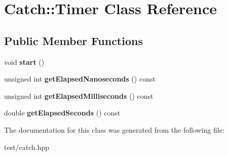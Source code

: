 \hypertarget{classCatch_1_1Timer}{}\section{Catch\+:\+:Timer Class Reference}
\label{classCatch_1_1Timer}
\subsection*{Public Member Functions}
\begin{DoxyCompactItemize}
\item 
void {\bfseries start} ()\hypertarget{classCatch_1_1Timer_a0a56e879e43f36c102bf9ea8b5fc8b72}{}\label{classCatch_1_1Timer_a0a56e879e43f36c102bf9ea8b5fc8b72}

\item 
unsigned int {\bfseries get\+Elapsed\+Nanoseconds} () const \hypertarget{classCatch_1_1Timer_ad88ea4dc75a07e5c6d870f5f979663a1}{}\label{classCatch_1_1Timer_ad88ea4dc75a07e5c6d870f5f979663a1}

\item 
unsigned int {\bfseries get\+Elapsed\+Milliseconds} () const \hypertarget{classCatch_1_1Timer_a4cf3f9fbee9c76e87d989d9bc6913b68}{}\label{classCatch_1_1Timer_a4cf3f9fbee9c76e87d989d9bc6913b68}

\item 
double {\bfseries get\+Elapsed\+Seconds} () const \hypertarget{classCatch_1_1Timer_a8500ef3481a9bf6ae81337972d9f95a3}{}\label{classCatch_1_1Timer_a8500ef3481a9bf6ae81337972d9f95a3}

\end{DoxyCompactItemize}


The documentation for this class was generated from the following file\+:\begin{DoxyCompactItemize}
\item 
test/catch.\+hpp\end{DoxyCompactItemize}

